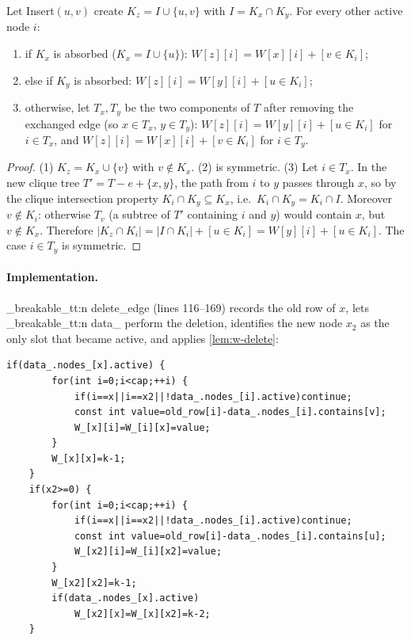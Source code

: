 \documentclass[11pt,a4paper,oneside]{report}
\theoremstyle{plain}
\theoremstyle{definition}
\theoremstyle{remark}
\newcommand{\op}[1]{\textsf{#1}}
\DeclareRobustCommand{\code}[1]{\mtp_breakable_tt:n {#1}}
\DeclareRobustCommand{\file}[1]{\mtp_breakable_tt:n {#1}}
\begin{document}
\begin{lemma}[\(W\) after \op{Insert}; Ibarra \S5.1]\label{lem:w-insert}
Let \op{Insert}\((u,v)\) create \(K_z=I\cup\{u,v\}\) with \(I=K_x\cap K_y\). For every other
active node \(i\):
\begin{enumerate}
\item if \(K_x\) is absorbed (\(K_x=I\cup\{u\}\)): \(W[z][i]=W[x][i]+[v\in K_i]\);
\item else if \(K_y\) is absorbed: \(W[z][i]=W[y][i]+[u\in K_i]\);
\item otherwise, let \(T_x,T_y\) be the two components of \(T\) after removing the exchanged edge
  (so \(x\in T_x\), \(y\in T_y\)): \(W[z][i]=W[y][i]+[u\in K_i]\) for \(i\in T_x\), and
  \(W[z][i]=W[x][i]+[v\in K_i]\) for \(i\in T_y\).
\end{enumerate}
\end{lemma}
\begin{proof}
(1) \(K_z=K_x\cup\{v\}\) with \(v\notin K_x\). (2) is symmetric. (3) Let \(i\in T_x\). In the
new clique tree \(T'=T-e+\{x,y\}\), the path from \(i\) to \(y\) passes through \(x\), so by the
clique intersection property \(K_i\cap K_y\subseteq K_x\), i.e.\ \(K_i\cap K_y=K_i\cap I\).
Moreover \(v\notin K_i\): otherwise \(T_v\) (a subtree of \(T'\) containing \(i\) and \(y\))
would contain \(x\), but \(v\notin K_x\). Therefore
\(|K_z\cap K_i|=|I\cap K_i|+[u\in K_i]=W[y][i]+[u\in K_i]\). The case \(i\in T_y\) is
symmetric.
\end{proof}

\paragraph{Implementation.} \code{delete_edge} (lines 116--169) records the old row of \(x\),
lets \code{data_} perform the deletion, identifies the new node \(x_2\) as the only slot that
became active, and applies \cref{lem:w-delete}:

\begin{lstlisting}[style=cpp,firstnumber=150,caption={\file{src/dynamic_ibarra_a2.cpp}, lines 150--167: \(W\) update after \op{Delete} (\cref{lem:w-delete}).},label={lst:a2-wdel}]
    if(data_.nodes_[x].active) {
        for(int i=0;i<cap;++i) {
            if(i==x||i==x2||!data_.nodes_[i].active)continue;
            const int value=old_row[i]-data_.nodes_[i].contains[v];
            W_[x][i]=W_[i][x]=value;
        }
        W_[x][x]=k-1;
    }
    if(x2>=0) {
        for(int i=0;i<cap;++i) {
            if(i==x||i==x2||!data_.nodes_[i].active)continue;
            const int value=old_row[i]-data_.nodes_[i].contains[u];
            W_[x2][i]=W_[i][x2]=value;
        }
        W_[x2][x2]=k-1;
        if(data_.nodes_[x].active)
            W_[x2][x]=W_[x][x2]=k-2;
    }
\end{lstlisting}
\end{document}
